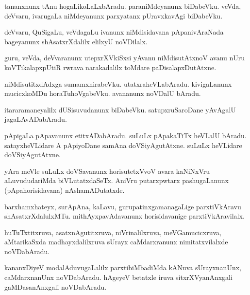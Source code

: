 \documentclass{article}
\begin{document}
\begin{mn}
tananxnunx tAnu hogaLikoLaLxbAradu. paraniMdeyanunx biDabeVku. veVda, deVvaru, ivarugaLa 
niMdeyanunx parxyatanx pUravxkavAgi biDabeVku.
\end{mn}

\begin{mn}
deVvaru, QuSigaLu, veVdagaLu ivanunx niMdisidavana pApanivAraNada bageyanunx shAsatxrXdalilx 
elilxyU noVDilalx.
\end{mn}

\begin{mn}
guru, veVda, deVvaranunx utepxrXVkiSxsi yAvanu niMdisutAtxnoV avanu nUru koVTikalapxpUtiR rwrava 
narakadalilx toMdare paDisalapxDutAtxne. 
\end{mn}

\begin{mn}
niMdisutitxdAdxga sumamxnirabeVku. utatxraheVLabAradu. kivigaLanunx mucicxkoMDu 
horaTuhoVgabeVku. avananunx noVDalU bAradu.
\end{mn}

\begin{mn}
itararamaneyalilx dUSisuvudanunx biDabeVku. satupxruSaroDane yAvAgalU jagaLAvADabAradu.
\end{mn}

\begin{mn}
pApigaLa pApavanunx etitxADabAradu. suLuLx pApakaTiTx heVLalU bAradu. satayxheVLidare A 
pApiyoDane samAna doVSiyAgutAtxne. suLuLx heVLidare doVSiyAgutAtxne.
\end{mn}

\begin{mn}
yAra meVle suLuLx doVSavanunx horisutetxVvoV avara kaNiNxVru aLuvududariMda biVLutatxdaSeTx. AniVru
putarxpwtarx pashugaLanunx (pApahorisidavana) nAshamADutatxde.
\end{mn}

\begin{mn}
barxhamxhateyx, surApAna, kaLavu, gurupatinxgamanagaLige parxtiVkAravu shAsatxrXdalulxMTu. 
mithAyxpavAdavanunx horisidavanige parxtiVkAravilalx.
\end{mn}

\begin{mn}
huTuTxtitxruva, asatxnAgutitxruva, niVrinalilxruva, meVGamucicxruva, aMtarikaSxda 
madhayxdalilxruva sUrayx caMdarxranunx nimitatxvilalxde noVDabAradu.
\end{mn}

\begin{mn}
kananxDiyeV modalAduvugaLalilx parxtibiMbadiMda kANuva sUrayxnanUnx, caMdarxnanUnx noVDabAradu. 
hAgeyeV betatxle iruva sitxrXVyanAnxgali gaMDasanAnxgali noVDabAradu.
\end{mn}
\end{document}

